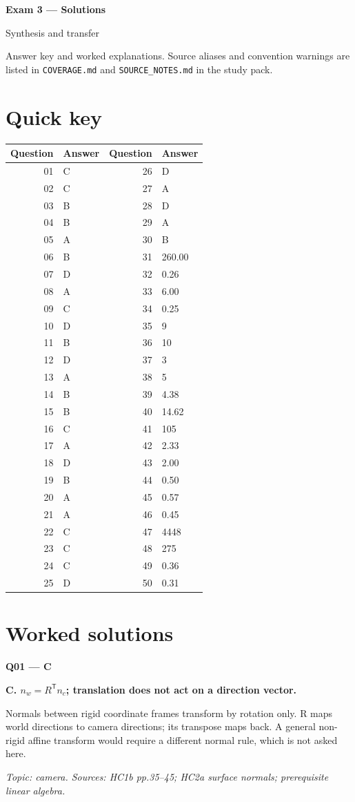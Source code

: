 \documentclass[11pt,a4paper]{article}
\begin{document}
{\LARGE\bfseries Exam 3 — Solutions}\par
{\large Synthesis and transfer}\par\bigskip
Answer key and worked explanations. Source aliases and convention warnings are listed in \texttt{COVERAGE.md} and \texttt{SOURCE\_NOTES.md} in the study pack.
\section*{Quick key}
\begin{longtable}{@{}r l@{\hspace{25mm}}r l@{}}
\toprule Question & Answer & Question & Answer \\ \midrule
01 & C & 26 & D \\
02 & C & 27 & A \\
03 & B & 28 & D \\
04 & B & 29 & A \\
05 & A & 30 & B \\
06 & B & 31 & 260.00 \\
07 & D & 32 & 0.26 \\
08 & A & 33 & 6.00 \\
09 & C & 34 & 0.25 \\
10 & D & 35 & 9 \\
11 & B & 36 & 10 \\
12 & D & 37 & 3 \\
13 & A & 38 & 5 \\
14 & B & 39 & 4.38 \\
15 & B & 40 & 14.62 \\
16 & C & 41 & 105 \\
17 & A & 42 & 2.33 \\
18 & D & 43 & 2.00 \\
19 & B & 44 & 0.50 \\
20 & A & 45 & 0.57 \\
21 & A & 46 & 0.45 \\
22 & C & 47 & 4448 \\
23 & C & 48 & 275 \\
24 & C & 49 & 0.36 \\
25 & D & 50 & 0.31 \\
\bottomrule\end{longtable}
\clearpage\section*{Worked solutions}
\begin{minipage}{\linewidth}
\textbf{Q01 — C}\par\smallskip
\textbf{C. \(n_w=R^{\mathsf T}n_c\); translation does not act on a direction vector.}\par
Normals between rigid coordinate frames transform by rotation only. R maps world directions to camera directions; its transpose maps back. A general non-rigid affine transform would require a different normal rule,\allowbreak{} which is not asked here.\par
{\small\itshape Topic: camera. Sources: HC1b pp.35–45; HC2a surface normals; prerequisite linear algebra.}

\end{minipage}
\end{document}
